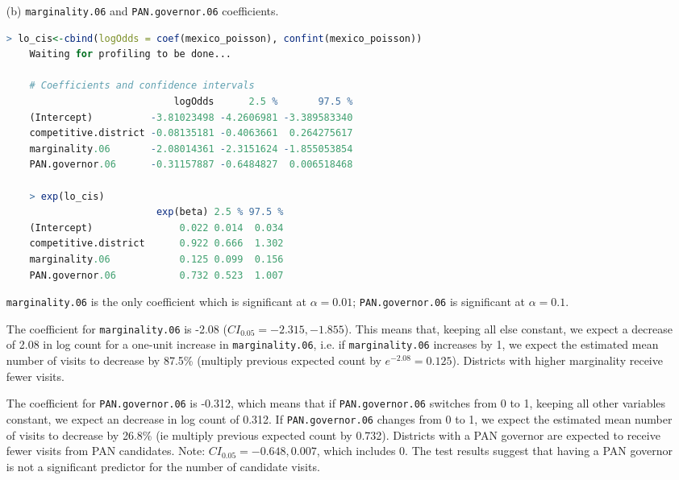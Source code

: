 \documentclass[12pt,letterpaper]{article}
\begin{document}
\begin{enumerate}
\begin{enumerate}[1.]

	\end{enumerate}

	\item [(b)]  \texttt{marginality.06} and \texttt{PAN.governor.06} coefficients.
  \begin{lstlisting}[language=R]
    > lo_cis<-cbind(logOdds = coef(mexico_poisson), confint(mexico_poisson))
    Waiting for profiling to be done...

    # Coefficients and confidence intervals
                             logOdds      2.5 %       97.5 %
    (Intercept)          -3.81023498 -4.2606981 -3.389583340
    competitive.district -0.08135181 -0.4063661  0.264275617
    marginality.06       -2.08014361 -2.3151624 -1.855053854
    PAN.governor.06      -0.31157887 -0.6484827  0.006518468

    > exp(lo_cis) 
                          exp(beta) 2.5 % 97.5 %
    (Intercept)               0.022 0.014  0.034
    competitive.district      0.922 0.666  1.302
    marginality.06            0.125 0.099  0.156
    PAN.governor.06           0.732 0.523  1.007
  \end{lstlisting}

	
  \texttt{marginality.06} is the only coefficient which is significant at $\alpha=0.01$; \texttt{PAN.governor.06} is significant at $\alpha=0.1$.
  
	The coefficient for \texttt{marginality.06} is -2.08 ($CI_{0.05} = -2.315, -1.855$).  This means that, keeping all else constant, we expect a decrease of 2.08 in log count for a one-unit increase in \texttt{marginality.06}, i.e. if \texttt{marginality.06} increases by 1, we expect the estimated mean number of visits to decrease by 87.5\% (multiply previous expected count by $e^{-2.08}=0.125$).  Districts with higher marginality receive fewer visits.
	
	The coefficient for \texttt{PAN.governor.06} is -0.312, which means that if \texttt{PAN.governor.06} switches from 0 to 1, keeping all other variables constant, we expect an decrease in log count of 0.312.  If \texttt{PAN.governor.06} changes from 0 to 1, we expect the estimated mean number of visits to decrease by 26.8\% (ie multiply previous expected count by 0.732).  Districts with a PAN governor are expected to receive fewer visits from PAN candidates.  Note:  $CI_{0.05} = -0.648, 0.007$, which includes 0.  The test results suggest that having a PAN governor is not a significant predictor for the number of candidate visits.


\end{enumerate}
\end{document}

